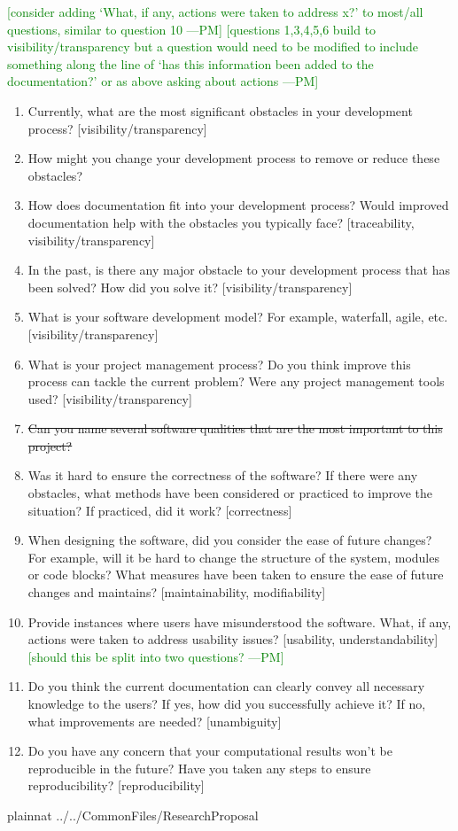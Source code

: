 \documentclass[12pt]{article}
\newcommand{\authornote}[3]{\textcolor{#1}{[#3 ---#2]}}
\newcommand{\authornote}[3]{}
\newcommand{\pmi}[1]{\authornote{green}{PM}{#1}} %
\begin{document}
\pmi{consider adding `What, if any, actions were taken to address x?' to most/all questions, similar to question 10}
\pmi{questions 1,3,4,5,6 build to visibility/transparency but a question would need to be modified to include something along the line of `has this information been added to the documentation?' or as above asking about actions}
\begin{enumerate}
\item Currently, what are the most significant obstacles in your development
process? [visibility/transparency]
\item How might you change your development process to remove or reduce these
obstacles?
\item How does documentation fit into your development process? Would improved
documentation help with the obstacles you typically face? [traceability, visibility/transparency]
\item In the past, is there any major obstacle to your development process that
has been solved? How did you solve it? [visibility/transparency]
\item What is your software development model? For example, waterfall, agile, etc. [visibility/transparency]
\item What is your project management process? Do you think improve this process
can tackle the current problem? Were any project management tools used? [visibility/transparency]
\item \sout{Can you name several software qualities that are the most important to
this project?}
\item Was it hard to ensure the correctness of the software? If there were any
 obstacles, what methods have been considered or practiced to improve the situation? If practiced, did it work? [correctness]
\item When designing the software, did you consider the ease of future changes?
 For example, will it be hard to change the structure of the system, modules or code blocks? What measures have been taken to ensure the ease of future changes and maintains? [maintainability, modifiability]
\item Provide instances where users have misunderstood the software. What, if any, actions were taken to address usability issues? [usability, understandability] \pmi{should this be split into two questions?}
\item Do you think the current documentation can clearly convey all necessary
knowledge to the users? If yes, how did you successfully achieve it? If no, what
improvements are needed? [unambiguity]
\item Do you have any concern that your computational results won't be
reproducible in the future? Have you taken any steps to ensure reproducibility? [reproducibility]
\end{enumerate}

\newpage

 {plainnat}
 {../../CommonFiles/ResearchProposal}
\end{document}
